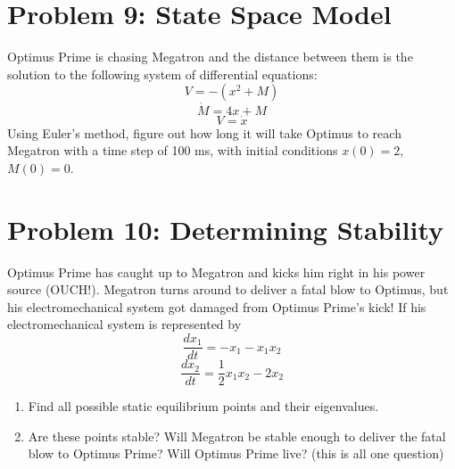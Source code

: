 \documentclass{article}
\begin{document}
\section*{Problem 9: State Space Model} 
Optimus Prime is chasing Megatron and the distance between them is the solution to the following system of differential equations:
\begin{equation}
    V=-(x^2 + M) \nonumber
\end{equation}
\begin{equation}
    \dot{M}=4x+M \nonumber
\end{equation}
\begin{equation}
    V=\dot{x} \nonumber
\end{equation}
Using Euler's method, figure out how long it will take Optimus to reach Megatron with a time step of 100 ms, with initial conditions $x(0)=2$, $M(0)=0$.
\newpage %
\noindent 
\section*{Problem 10: Determining Stability}
Optimus Prime has caught up to Megatron and kicks him right in his power source (OUCH!). Megatron turns around to deliver a fatal blow to Optimus, but his electromechanical system got damaged from Optimus Prime's kick! If his electromechanical system is represented by
\begin{equation}
    \frac{dx_1}{dt} = -x_1 - x_1x_2 \nonumber
\end{equation}
\begin{equation}
    \frac{dx_2}{dt} = \frac{1}{2}x_1x_2-2x_2 \nonumber
\end{equation}
\begin{enumerate}[label=(\alph*)]
    \item {Find all possible static equilibrium points and their eigenvalues.}
    \item {Are these points stable? Will Megatron be stable enough to deliver the fatal blow to Optimus Prime? Will Optimus Prime live? (this is all one question)}

\end{enumerate}
\end{document}
